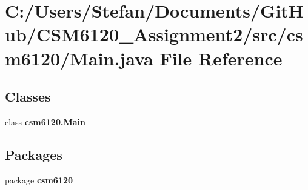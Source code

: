 \section{C\+:/\+Users/\+Stefan/\+Documents/\+Git\+Hub/\+C\+S\+M6120\+\_\+\+Assignment2/src/csm6120/\+Main.java File Reference}
\label{_main_8java}
\subsection*{Classes}
\begin{DoxyCompactItemize}
\item 
class {\bf csm6120.\+Main}
\end{DoxyCompactItemize}
\subsection*{Packages}
\begin{DoxyCompactItemize}
\item 
package {\bf csm6120}
\end{DoxyCompactItemize}
